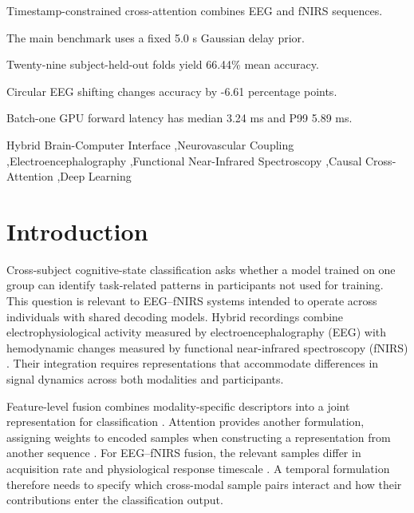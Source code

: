 \documentclass[final,5p,times,twocolumn]{elsarticle}
\begin{document}
\begin{frontmatter}
\begin{highlights}
\item Timestamp-constrained cross-attention combines EEG and fNIRS sequences.
\item The main benchmark uses a fixed 5.0 s Gaussian delay prior.
\item Twenty-nine subject-held-out folds yield 66.44\% mean accuracy.
\item Circular EEG shifting changes accuracy by -6.61 percentage points.
\item Batch-one GPU forward latency has median 3.24 ms and P99 5.89 ms.
\end{highlights}

\begin{keyword}
Hybrid Brain-Computer Interface \sep Neurovascular Coupling \sep Electroencephalography \sep Functional Near-Infrared Spectroscopy \sep Causal Cross-Attention \sep Deep Learning
\end{keyword}

\end{frontmatter}

\section{Introduction}
\label{sec:intro}
Cross-subject cognitive-state classification asks whether a model trained on one group can identify task-related patterns in participants not used for training. This question is relevant to EEG--fNIRS systems intended to operate across individuals with shared decoding models. Hybrid recordings combine electrophysiological activity measured by electroencephalography (EEG) with hemodynamic changes measured by functional near-infrared spectroscopy (fNIRS) \cite{fazli2012enhanced, buccino2016hybrid}. Their integration requires representations that accommodate differences in signal dynamics across both modalities and participants.

Feature-level fusion combines modality-specific descriptors into a joint representation for classification \cite{fazli2012enhanced}. Attention provides another formulation, assigning weights to encoded samples when constructing a representation from another sequence \cite{vaswani2017attention}. For EEG--fNIRS fusion, the relevant samples differ in acquisition rate and physiological response timescale \cite{shin2017open, buxton1998dynamics}. A temporal formulation therefore needs to specify which cross-modal sample pairs interact and how their contributions enter the classification output.
\end{document}
